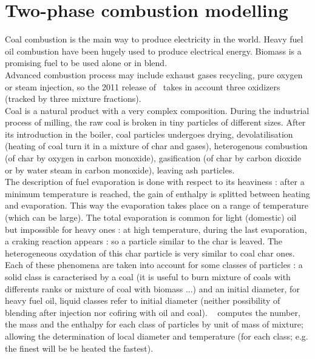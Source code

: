 \section{Two-phase combustion modelling}


Coal combustion is the main way to produce electricity in the world. Heavy fuel
oil combustion have been hugely used to produce electrical energy.
Biomass is a promising fuel to be used alone or in blend.\\
Advanced combustion process may include exhaust gases recycling, pure oxygen or
steam injection, so the 2011 release of \CS ~takes in account
three oxidizers (tracked by three mixture fractions).\\
Coal is a natural product with a very complex composition. During the industrial
process of milling, the raw coal is broken in tiny particles of different
sizes. After its introduction in the boiler, coal particles undergoes drying,
devolatilisation (heating of coal turn it in a mixture of char and gases),
heterogenous combustion (of char by oxygen in carbon monoxide), gasification (of
char by carbon
dioxide or by water steam in carbon monoxide), leaving ash particles.\\
The description of fuel evaporation is done with respect to its heaviness :
after a minimum temperature is reached, the gain of enthalpy is splitted between
heating and evaporation. This way the evaporation takes place on a range of
temperature (which can be large). The total evaporation is common for light
(domestic) oil but impossible for heavy ones : at high temperature, during the
last evaporation, a craking reaction appears : so a particle similar to the char
is leaved. The heterogeneous oxydation of this char particle is very similar to
coal char ones.\\
Each of these phenomena are taken into account for some classes of particles : a
solid class is caracterised by a coal (it is useful to burn mixture of coals
with differents ranks or mixture of coal with biomass ...) and an initial
diameter, for heavy fuel oil, liquid classes refer to initial diameter (neither
possibility of blending after injection nor cofiring with oil and coal). \CS~
computes the number, the mass and the enthalpy for each class of particles by
unit of mass of mixture; allowing the determination of local diameter and
temperature (for each class;
e.g. the finest will be be heated the fastest).\\

